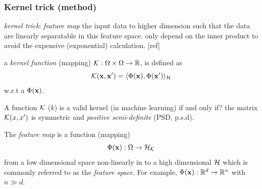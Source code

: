 \subsubsection*{Kernel trick (method)}
\emph{kernel trick}: \emph{feature map} the input data to higher dimension such that the data are linearly separatable in this feature space.
only depend on the inner product to avoid the expensive (exponential) calculation. [ref]
\begin{definition}\label{def:kernel}
	a \emph{kernel function} (mapping) $\mathcal{K}: \Omega\times\Omega\to\mathbb{R}$,
	is defined as 
	\begin{equation}
		\mathcal{K}(\vb{x},\vb{x}') = \langle \Phi(\vb{x}),\Phi(\vb{x}') \rangle_{\mathcal{H}}
		\label{eq:kernel_classical}
	\end{equation}
	w.r.t a  $\Phi(\vb{x})$.
\end{definition}
\begin{remark}
	A function $\mathcal{K}$ ($k$) is a valid kernel (in machine learning) if and only if? the matrix $\mathcal{K}(x,x')$ is symmetric and \emph{positive semi-definite} (PSD, p.s.d).
\end{remark}
\begin{definition}\label{def:feature_map_classical}
	The \emph{feature map} is a function (mapping)
	\begin{equation}
		\Phi(\vb{x}) : \Omega \to \mathcal{H}_{\mathcal{K}}
		\label{eq:feature_map_classical}
	\end{equation}
	from a low dimensional space non-linearly in to a high dimensional  $\mathcal{H}$ which is commonly referred to as the \emph{feature space}.
	For example, $\Phi(\vb{x}):\mathbb{R}^d \to \mathbb{R}^n$ with $n\gg d$.
\end{definition}
